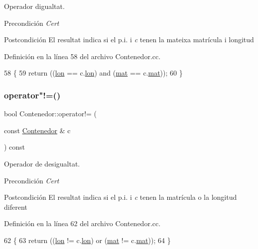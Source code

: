 Operador d\textquotesingle{}igualtat. 

\begin{DoxyPrecond}{Precondición}
{\itshape Cert} 
\end{DoxyPrecond}
\begin{DoxyPostcond}{Postcondición}
El resultat indica si el p.\+i. i {\itshape c} tenen la mateixa matrícula i longitud 
\end{DoxyPostcond}


Definición en la línea 58 del archivo Contenedor.\+cc.


\begin{DoxyCode}
58                                                      \{
59   \textcolor{keywordflow}{return} ((\hyperlink{class_contenedor_a364e04e5a1c7787463981f192f48e4ce}{lon} == c.\hyperlink{class_contenedor_a364e04e5a1c7787463981f192f48e4ce}{lon}) and (\hyperlink{class_contenedor_a219718cff2c0f94314defbf8d747bfa9}{mat} == c.\hyperlink{class_contenedor_a219718cff2c0f94314defbf8d747bfa9}{mat}));
60 \}
\end{DoxyCode}
\mbox{\label{class_contenedor_a740ea02e3530462a00f8a6ce18b2bf9c}} 
\subsubsection{\texorpdfstring{operator"!=()}{operator!=()}}
{\footnotesize\ttfamily bool Contenedor\+::operator!= (\begin{DoxyParamCaption}\item[{const \hyperlink{class_contenedor}{Contenedor} \&}]{c }\end{DoxyParamCaption}) const}



Operador de desigualtat. 

\begin{DoxyPrecond}{Precondición}
{\itshape Cert} 
\end{DoxyPrecond}
\begin{DoxyPostcond}{Postcondición}
El resultat indica si el p.\+i. i {\itshape c} tenen la matrícula o la longitud diferent 
\end{DoxyPostcond}


Definición en la línea 62 del archivo Contenedor.\+cc.


\begin{DoxyCode}
62                                                      \{
63   \textcolor{keywordflow}{return} ((\hyperlink{class_contenedor_a364e04e5a1c7787463981f192f48e4ce}{lon} != c.\hyperlink{class_contenedor_a364e04e5a1c7787463981f192f48e4ce}{lon}) or (\hyperlink{class_contenedor_a219718cff2c0f94314defbf8d747bfa9}{mat} != c.\hyperlink{class_contenedor_a219718cff2c0f94314defbf8d747bfa9}{mat}));
64 \}
\end{DoxyCode}
\mbox{\label{class_contenedor_a9d590c94118fcc15af16ba5a6be35d09}} 
